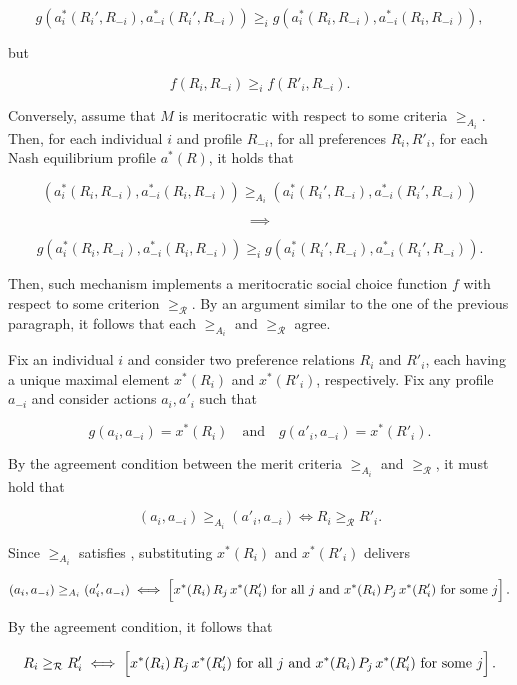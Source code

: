 \begin{implproof}
	\[
		g (a_i^*(R_i', R_{-i}), a_{-i}^*(R_i', R_{-i})) \geq_i g (a_i^*(R_i, R_{-i}), a_{-i}^*(R_i, R_{-i}) ) ,
	\]

	but

	\[ f (R_i, R_{-i}) \geq_i f (R'_i, R_{-i} ) . \]

	Conversely, assume that \( M \) is meritocratic with respect to some criteria \( \geq_{A_i} \). Then, for each individual \( i \) and profile \( R_{-i} \), for all preferences \( R_i, R'_i \), for each Nash equilibrium profile \( a^{*} ( R ) \), it holds that

	\[
		( a_i^*(R_i, R_{-i}), a_{-i}^*(R_i, R_{-i}) ) \geq_{A_i} ( a_i^*(R_i', R_{-i}), a_{-i}^*(R_i', R_{-i}) )
	\]

	\[ \implies \]

	\[
		g ( a_i^*(R_i, R_{-i}), a_{-i}^*(R_i, R_{-i}) ) \geq_i g ( a_i^*(R_i', R_{-i}), a_{-i}^*(R_i', R_{-i}) ) .
	\]

	Then, such mechanism implements a meritocratic social choice function \( f \) with respect to some criterion \( \geq_{\mathcal{R}} \). By an argument similar to the one of the previous paragraph, it follows that each \( \geq_{A_i} \) and \( \geq_{\mathcal{R}} \) agree.
\end{implproof}

\begin{paretoproof}
	Fix an individual \( i \) and consider two preference relations \( R_i \) and \( R'_i \), each having a unique maximal element \( x^{*}(R_i) \) and \( x^{*}(R'_i) \), respectively. Fix any profile \( a_{-i} \) and consider actions \( a_i, a'_i \) such that

	\[
		g(a_i,a_{-i}) = x^{*}(R_i) \quad \text{and} \quad g(a'_i,a_{-i}) = x^{*}(R'_i).
	\]

	By the agreement condition between the merit criteria \( \geq_{A_i} \) and \( \geq_{\mathcal{R}} \), it must hold that

	\[
		(a_i,a_{-i}) \geq_{A_i} (a'_i,a_{-i}) \iff R_i \geq_{\mathcal{R}} R'_i.
	\]

	Since \( \geq_{A_i} \) satisfies , substituting \( x^{*}(R_i) \) and \( x^{*}(R'_i) \) delivers

	\[
		(a_i,a_{-i}) \geq_{A_i} (a'_i,a_{-i}) \iff \Bigl[ x^{*}(R_i) \, R_j \, x^{*}(R'_i) \text{ for all } j \text{ and } x^{*}(R_i) \, P_j \, x^{*}(R'_i) \text{ for some } j \Bigr]\,.
	\]

	By the agreement condition, it follows that

	\[
		R_i \geq_{\mathcal{R}} R'_i \iff \Bigl[ x^{*}(R_i) \, R_j \, x^{*}(R'_i) \text{ for all } j \text{ and } x^{*}(R_i) \, P_j \, x^{*}(R'_i) \text{ for some } j \Bigr]\,.
	\]
\end{paretoproof}

